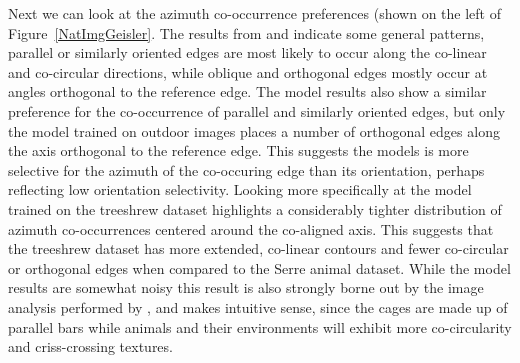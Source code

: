 Next we can look at the azimuth co-occurrence preferences (shown on
the left of Figure~\ref{NatImgGeisler}. The results from
\cite{Geisler2001} and \cite{Perrinet2015} indicate some general
patterns, parallel or similarly oriented edges are most likely to
occur along the co-linear and co-circular directions, while oblique
and orthogonal edges mostly occur at angles orthogonal to the
reference edge. The model results also show a similar preference for
the co-occurrence of parallel and similarly oriented edges, but only
the model trained on outdoor images places a number of orthogonal
edges along the axis orthogonal to the reference edge. This suggests
the models is more selective for the azimuth of the co-occuring edge
than its orientation, perhaps reflecting low orientation selectivity.
Looking more specifically at the model trained on the treeshrew
dataset highlights a considerably tighter distribution of azimuth
co-occurrences centered around the co-aligned axis. This suggests that
the treeshrew dataset has more extended, co-linear contours and fewer
co-circular or orthogonal edges when compared to the Serre animal
dataset. While the model results are somewhat noisy this result is
also strongly borne out by the image analysis performed by
\cite{Perrinet2015}, and makes intuitive sense, since the cages are
made up of parallel bars while animals and their environments will
exhibit more co-circularity and criss-crossing textures.



